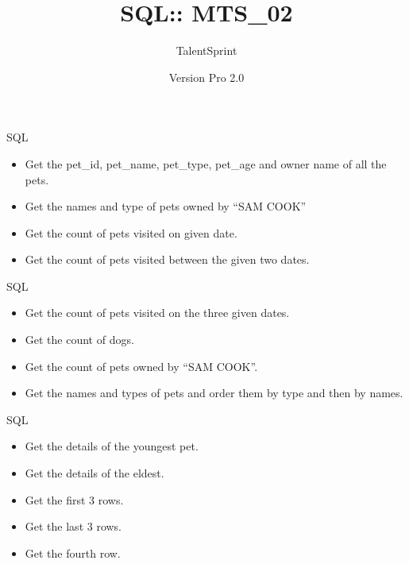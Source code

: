 \documentclass[14pt]{beamer}
\title[BPT:VCS:01]{SQL:: MTS\_02}
\author[TS]{TalentSprint}
\institute[L\&D]{Licensed To Skill}
\date{Version Pro 2.0}
\begin{document}
\begin{frame}
  \titlepage
\end{frame}

\begin{frame}{SQL}
 \begin{itemize}
  \item Get the pet\_id, pet\_name, pet\_type, pet\_age and owner name of all the pets.
  \item Get the names and type of pets owned by ``SAM COOK''
  \item Get the count of pets visited on given date.
  \item Get the count of pets visited between the given two dates.
 \end{itemize}
\end{frame}

\begin{frame}{SQL}
 \begin{itemize}
  \item Get the count of pets visited on the three given dates.
  \item Get the count of dogs.
  \item Get the count of pets owned by ``SAM COOK''.
  \item Get the names and types of pets and order them by type and then by names.
 \end{itemize}
\end{frame}

\begin{frame}{SQL}
 \begin{itemize}
  \item Get the details of the youngest pet.
  \item Get the details of the eldest.
  \item Get the first 3 rows.
  \item Get the last 3 rows.
\item Get the fourth row.
 \end{itemize}
\end{frame}
\end{document}
